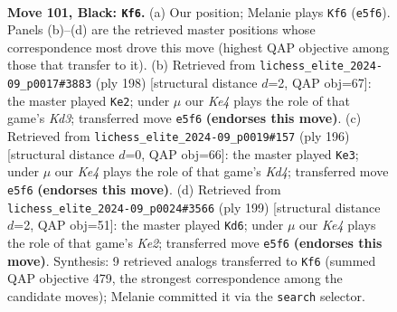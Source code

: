 \documentclass[11pt]{article}
\begin{document}
\clearpage

\begin{figure}[p]\centering
\begin{subfigure}{0.46\textwidth}\centering
\resizebox{\linewidth}{!}{%
\newchessgame
\chessboard[
  setfen={4R3/8/8/4k3/7r/r7/5K2/8 b - - 13 101},
  showmover=false,
  pgfstyle=straightmove, color=movearrow, markmove={e5-f6}
]}
\caption{}
\end{subfigure}\hfill
\begin{subfigure}{0.46\textwidth}\centering
\resizebox{\linewidth}{!}{%
\newchessgame
\chessboard[
  setfen={6R1/3k4/8/8/8/r2K4/8/8 w - - 58 100},
  showmover=false,
  pgfstyle=straightmove, color=movearrow, markmove={d3-e2}
]}
\caption{}
\end{subfigure}
\\[4pt]
\begin{subfigure}{0.46\textwidth}\centering
\resizebox{\linewidth}{!}{%
\newchessgame
\chessboard[
  setfen={1R6/8/8/k7/3K2r1/8/2R5/8 w - - 17 99},
  showmover=false,
  pgfstyle=straightmove, color=movearrow, markmove={d4-e3}
]}
\caption{}
\end{subfigure}\hfill
\begin{subfigure}{0.46\textwidth}\centering
\resizebox{\linewidth}{!}{%
\newchessgame
\chessboard[
  setfen={8/R3k3/8/1r6/4K3/8/8/8 b - - 37 100},
  showmover=false,
  pgfstyle=straightmove, color=movearrow, markmove={e7-d6}
]}
\caption{}
\end{subfigure}
\caption{\textbf{Move 101, Black: \texttt{Kf6}.} (a) Our position; Melanie plays \texttt{Kf6} (\texttt{e5f6}). Panels (b)--(d) are the retrieved master positions whose correspondence most drove this move (highest QAP objective among those that transfer to it). (b) Retrieved from \texttt{lichess\_elite\_2024-09\_p0017\#3883} (ply 198) [structural distance $d$=2, QAP obj=67]: the master played \texttt{Ke2}; under $\mu$ our \emph{Ke4} plays the role of that game's \emph{Kd3}; transferred move \texttt{e5f6} \textbf{(endorses this move)}. (c) Retrieved from \texttt{lichess\_elite\_2024-09\_p0019\#157} (ply 196) [structural distance $d$=0, QAP obj=66]: the master played \texttt{Ke3}; under $\mu$ our \emph{Ke4} plays the role of that game's \emph{Kd4}; transferred move \texttt{e5f6} \textbf{(endorses this move)}. (d) Retrieved from \texttt{lichess\_elite\_2024-09\_p0024\#3566} (ply 199) [structural distance $d$=2, QAP obj=51]: the master played \texttt{Kd6}; under $\mu$ our \emph{Ke4} plays the role of that game's \emph{Ke2}; transferred move \texttt{e5f6} \textbf{(endorses this move)}. Synthesis: 9 retrieved analogs transferred to \texttt{Kf6} (summed QAP objective 479, the strongest correspondence among the candidate moves); Melanie committed it via the \texttt{search} selector.}
\label{fig:thought-m201}
\end{figure}
\end{document}

